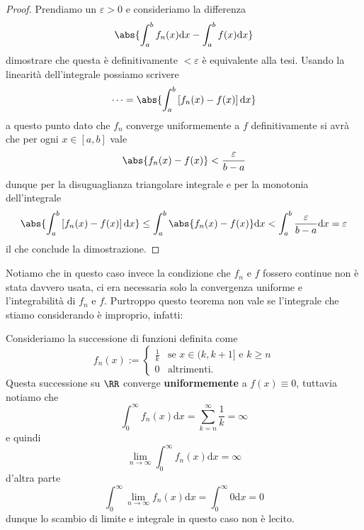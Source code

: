 \documentclass[11pt]{scrartcl}
\newcommand{\dif}{\text{d}}
\begin{document}
	\begin{proof}
		Prendiamo un $\varepsilon>0$ e consideriamo la differenza
		$$\abs{\int_a^bf_n(x)\dif x-\int_a^b f(x)\dif x}$$
		dimostrare che questa è definitivamente $<\varepsilon$ è equivalente alla tesi. Usando la linearità dell'integrale possiamo scrivere
		$$\dots=\abs{\int_a^b\left[f_n(x)-f(x)\right]\dif x}$$
		a questo punto dato che $f_n$ converge uniformemente a $f$ definitivamente si avrà che per ogni $x\in [a,b]$ vale 
		$$\abs{f_n(x)-f(x)}<\frac{\varepsilon}{b-a}$$
		dunque per la disuguaglianza triangolare integrale e per la monotonia dell'integrale
		$$\abs{\int_a^b\left[f_n(x)-f(x)\right]\dif x}\le \int_a^b\abs{f_n(x)-f(x)}\dif x< \int_a^b\frac{\varepsilon}{b-a}\dif x=\varepsilon$$
		il che conclude la dimostrazione.
	\end{proof}
	Notiamo che in questo caso invece la condizione che $f_n$ e $f$ fossero continue non è stata davvero usata, ci era necessaria solo la convergenza uniforme e l'integrabilità di $f_n$ e $f$. Purtroppo questo teorema non vale se l'integrale che stiamo considerando è improprio, infatti:
	\begin{example}
		Consideriamo la successione di funzioni definita come
		$$f_n(x):=\begin{cases}
			\frac{1}{k} & \text{se $x\in (k,k+1]$ e $k\ge n$} \\
			0 & \text{altrimenti}.
		\end{cases}$$
		Questa successione su $\RR$ converge \textbf{uniformemente} a $f(x)\equiv 0$, tuttavia notiamo che
		$$\int_0^\infty f_n(x)\dif x=\sum_{k=n}^{\infty}\frac{1}{k}=\infty$$
		e quindi
		$$\lim_{n\to\infty}\int_0^\infty f_n(x)\dif x=\infty$$
		d'altra parte
		$$\int_0^\infty \lim_{n\to\infty}f_n(x)\dif x=\int_0^\infty 0\dif x=0$$
		dunque lo scambio di limite e integrale in questo caso non è lecito. 
	\end{example}
\end{document}
